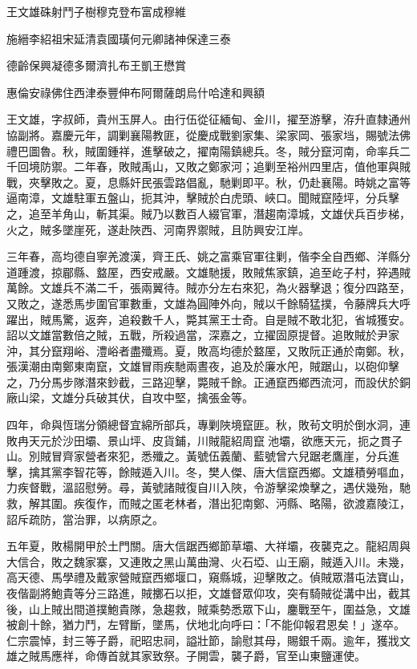 
\begin{pinyinscope}
王文雄硃射鬥子樹穆克登布富成穆維

施縉李紹祖宋延清袁國璜何元卿諸神保達三泰

德齡保興凝德多爾濟扎布王凱王懋賞

惠倫安祿佛住西津泰豐伸布阿爾薩朗烏什哈達和興額

王文雄，字叔師，貴州玉屏人。由行伍從征緬甸、金川，擢至游擊，洊升直隸通州協副將。嘉慶元年，調剿襄陽教匪，從慶成戰劉家集、梁家岡、張家垱，賜號法佛禮巴圖魯。秋，賊圍鍾祥，進擊破之，擢南陽鎮總兵。冬，賊分竄河南，命率兵二千回境防禦。二年春，敗賊禹山，又敗之鄭家河；追剿至裕州四里店，值他軍與賊戰，夾擊敗之。夏，息縣奸民張雲路倡亂，馳剿即平。秋，仍赴襄陽。時姚之富等逼南漳，文雄駐軍五盤山，扼其沖，擊賊於白虎頭、峽口。聞賊竄陸坪，分兵擊之，追至羊角山，斬其渠。賊乃以數百人綴官軍，潛趨南漳城，文雄伏兵百步梯，火之，賊多墜崖死，遂赴陜西、河南界禦賊，且防興安江岸。

三年春，高均德自寧羌渡漢，齊王氏、姚之富乘官軍往剿，偕李全自西鄉、洋縣分道踵渡，掠郿縣、盩厔，西安戒嚴。文雄馳援，敗賊焦家鎮，追至屹子村，猝遇賊萬餘。文雄兵不滿二千，張兩翼待。賊亦分左右來犯，為火器擊退；復分四路至，又敗之，遂悉馬步圍官軍數重，文雄為圓陣外向，賊以千餘騎猛撲，令藤牌兵大呼躍出，賊馬驚，返奔，追殺數千人，斃其黨王士奇。自是賊不敢北犯，省城獲安。詔以文雄當數倍之賊，五戰，所殺過當，深嘉之，立擢固原提督。追敗賊於尹家沖，其分竄翔峪、澧峪者盡殲焉。夏，敗高均德於盩厔，又敗阮正通於南鄭。秋，張漢潮由南鄭東南竄，文雄冒雨疾馳兩晝夜，追及於廉水戺，賊踞山，以砲仰擊之，乃分馬步隊潛來鈔截，三路迎擊，斃賊千餘。正通竄西鄉西流河，而設伏於銅廠山梁，文雄分兵破其伏，自攻中堅，擒張金等。

四年，命與恆瑞分領總督宜綿所部兵，專剿陜境竄匪。秋，敗茍文明於倒水洞，連敗冉天元於沙田壩、景山坪、皮貨鋪，川賊龍紹周竄池壩，欲應天元，扼之貫子山。別賊冒齊家營者來犯，悉殲之。黃號伍義蘭、藍號曾六兒踞老鷹崖，分兵進擊，擒其黨李智花等，餘賊遁入川。冬，樊人傑、唐大信竄西鄉。文雄積勞嘔血，力疾督戰，溫詔慰勞。尋，黃號諸賊復自川入陜，令游擊梁煥擊之，遇伏幾殆，馳救，解其圍。疾復作，而賊之匿老林者，潛出犯南鄭、沔縣、略陽，欲渡嘉陵江，詔斥疏防，當治罪，以病原之。

五年夏，敗楊開甲於土門關。唐大信踞西鄉節草壩、大祥壩，夜襲克之。龍紹周與大信合，敗之魏家寨，又連敗之黑山萬曲灣、火石埡、山王廟，賊遁入川。未幾，高天德、馬學禮及戴家營賊竄西鄉堰口，窺縣城，迎擊敗之。偵賊眾潛屯法寶山，夜偕副將鮑貴等分三路進，賊擲石以拒，文雄督眾仰攻，突有騎賊從溝中出，截其後，山上賊出間道撲鮑貴隊，急趨救，賊乘勢悉眾下山，鏖戰至午，圍益急，文雄被創十餘，猶力鬥，左臂斷，墜馬，伏地北向呼曰：「不能仰報君恩矣！」遂卒。仁宗震悼，封三等子爵，祀昭忠祠，謚壯節，諭慰其母，賜銀千兩。逾年，獲戕文雄之賊馬應祥，命傳首就其家致祭。子開雲，襲子爵，官至山東鹽運使。


\end{pinyinscope}
